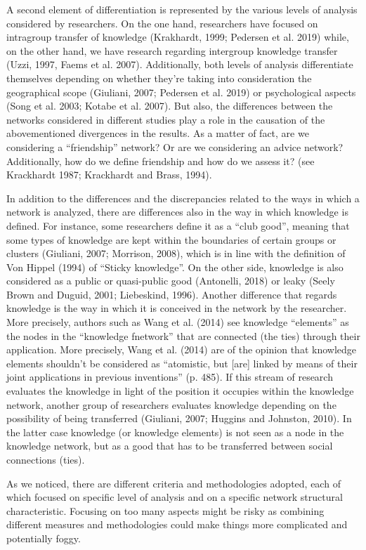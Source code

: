 \documentclass{article}
\begin{document}
A second element of differentiation is represented by the various levels of analysis considered by researchers. On the one hand, researchers have focused on intragroup transfer of knowledge (Krakhardt, 1999; Pedersen et al. 2019) while, on the other hand, we have research regarding intergroup knowledge transfer (Uzzi, 1997, Faems et al. 2007). Additionally, both levels of analysis differentiate themselves depending on whether they’re taking into consideration the geographical scope (Giuliani, 2007; Pedersen et al. 2019) or psychological aspects (Song et al. 2003; Kotabe et al. 2007).
But also, the differences between the networks considered in different studies play a role in the causation of the abovementioned divergences in the results. As a matter of fact, are we considering a “friendship” network? Or are we considering an advice network? Additionally, how do we define friendship and how do we assess it? (see Krackhardt 1987; Krackhardt and Brass, 1994).

In addition to the differences and the discrepancies related to the ways in which a network is analyzed, there are differences also in the way in which knowledge is defined. For instance, some researchers define it as a “club good”, meaning that some types of knowledge are kept within the boundaries of certain groups or clusters (Giuliani, 2007; Morrison, 2008), which is in line with the definition of Von Hippel (1994) of “Sticky knowledge”. On the other side, knowledge is also considered as a public or quasi-public good (Antonelli, 2018) or leaky (Seely Brown and Duguid, 2001; Liebeskind, 1996). Another difference that regards knowledge is the way in which it is conceived in the network by the researcher. More precisely, authors such as Wang et al. (2014) see knowledge “elements” as the nodes in the “knowledge fnetwork” that are connected (the ties) through their application. More precisely, Wang et al. (2014) are of the opinion that knowledge elements shouldn’t be considered as “atomistic, but [are] linked by means of their joint applications in previous inventions” (p. 485). If this stream of research evaluates the knowledge in light of the position it occupies within the knowledge network, another group of researchers evaluates knowledge depending on the possibility of being transferred (Giuliani, 2007; Huggins and Johnston, 2010). In the latter case knowledge (or knowledge elements) is not seen as a node in the knowledge network, but as a good that has to be transferred between social connections (ties).

As we noticed, there are different criteria and methodologies adopted, each of which focused on specific level of analysis and on a specific network structural characteristic. Focusing on too many aspects might be risky as combining different measures and methodologies could make things more complicated and potentially foggy.
\end{document}
